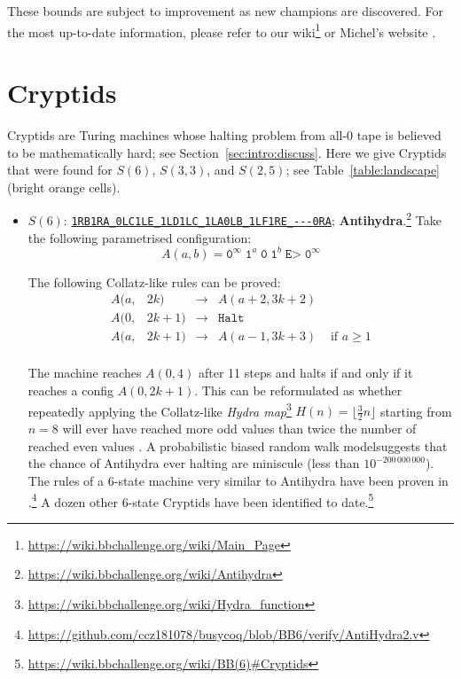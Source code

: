 \documentclass[a4paper,british]{article}
\theoremstyle{definition} %
\numberwithin{equation}{section}
\theoremstyle{definition} %
\newcommand{\tm}[1]{\href{https://bbchallenge.org/#1}{\texttt{\nolinkurl{#1}}}}
\newcommand{\szero}{\texttt{0}\xspace}
\newcommand{\sone}{\texttt{1}\xspace}
\begin{document}
These bounds are subject to improvement as new champions are discovered. For the most up-to-date information, please refer to our wiki\footnote{\url{https://wiki.bbchallenge.org/wiki/Main_Page}} or Michel’s website \cite{PMichel_website}.


\section{Cryptids}\label{app:cryptids}

Cryptids are Turing machines whose halting problem from all-0 tape is believed to be mathematically hard; see Section~\ref{sec:intro:discuss}. Here we give Cryptids that were found for $S(6)$, $S(3,3)$, and $S(2,5)$; see Table~\ref{table:landscape} (bright orange cells).

\begin{itemize}
    \item $S(6)$: \tm{1RB1RA_0LC1LE_1LD1LC_1LA0LB_1LF1RE_---0RA}; \textbf{Antihydra}.\footnote{\label{note:antihydra}\url{https://wiki.bbchallenge.org/wiki/Antihydra}} Take the following parametrised configuration:
          $$ A(a,b) = \szero^\infty \; \sone^a \; \szero \; \sone^b \; \texttt{E>} \; \szero^\infty$$

          The following Collatz-like rules can be proved:
          \[
              \begin{array}{llcll}
                  A(a, & 2k)   & \longrightarrow & A(a+2, 3k+2)                         \\
                  A(0, & 2k+1) & \longrightarrow & \texttt{Halt}                        \\
                  A(a, & 2k+1) & \longrightarrow & A(a-1, 3k+3)  & \text{ if } a \geq 1 \\
              \end{array}
          \]

          The machine reaches $A(0,4)$ after 11 steps and halts if and only if it reaches a config $A(0,2k+1)$. This can be reformulated as whether repeatedly applying the Collatz-like \textit{Hydra map}\footnote{\url{https://wiki.bbchallenge.org/wiki/Hydra_function}} $H(n) = \lfloor \frac{3}{2}n\rfloor$ starting from $n=8$ will ever have reached more odd values than twice the number of reached even values \cite{ligocki2024bb6antis}. A probabilistic biased random walk model suggests that the chance of Antihydra ever halting are miniscule (less than $10^{-200\,000\,000}$). The rules of a 6-state machine very similar to Antihydra have been proven in \Coq.\footnote{\url{https://github.com/ccz181078/busycoq/blob/BB6/verify/AntiHydra2.v}} A dozen other 6-state Cryptids have been identified to date.\footnote{\url{https://wiki.bbchallenge.org/wiki/BB(6)\#Cryptids}}



\end{itemize}
\end{document}
